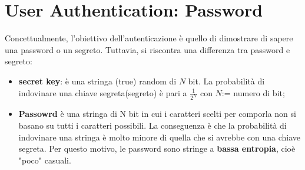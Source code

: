 \documentclass{article}
\theoremstyle{remark}
\begin{document}
\section{User Authentication: Password}
Concettualmente, l'obiettivo dell'autenticazione è quello di dimostrare di sapere una password o un segreto. Tuttavia, si riscontra una differenza tra password e segreto:\begin{itemize}
	\item \textbf{secret key}: è una stringa (true) random di $N$ bit. La probabilità di indovinare una chiave segreta(segreto) è pari a $\frac{1}{2^N}$ con $N$:= numero di bit;
	\item \textbf{Passowrd} è una stringa di N bit in cui i caratteri scelti per comporla non si basano su tutti i caratteri possibili. La conseguenza è che la probabilità di indovinare una stringa è molto minore di quella che si avrebbe con una chiave segreta. Per questo motivo, le password sono stringe a \textbf{bassa entropia}, cioè "poco" casuali.
\end{itemize}
\end{document}
